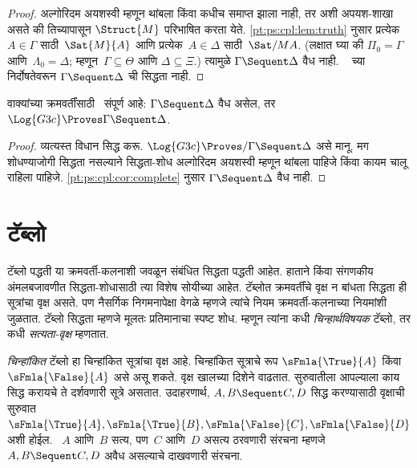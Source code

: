 \begin{proof}
  अल्गोरिदम अयशस्वी म्हणून थांबला किंवा कधीच समाप्त झाला नाही,
  तर अशी अपयश-शाखा असते की तिच्यापासून
  $\Struct{M}$ परिभाषित करता येते.
  \ref{pt:ps:cpl:lem:truth} नुसार प्रत्येक~$A \in \Gamma$
  साठी~$\Sat{M}{A}$ आणि प्रत्येक~$A \in \Delta$
  साठी~$\Sat/{M}{A}$. (लक्षात घ्या की
  $\Pi_0 = \Gamma$ आणि~$\Lambda_0 = \Delta$;
  म्हणून~$\Gamma \subseteq \Theta$ आणि
  $\Delta \subseteq \Xi$.) त्यामुळे
  $\Gamma \Sequent \Delta$ वैध नाही.
  ~ च्या निर्दोषतेवरून
  $\Gamma \Sequent \Delta$ ची सिद्धता नाही.
\end{proof}

\begin{cor}
वाक्यांच्या क्रमवर्तींसाठी~ संपूर्ण आहे:
$\Gamma \Sequent \Delta$ वैध असेल,
तर~$\Log{G3c} \Proves \Gamma \Sequent \Delta$.
\end{cor}

\begin{proof}
  व्यत्यस्त विधान सिद्ध करू.
  $\Log{G3c} \Proves/ \Gamma \Sequent \Delta$
  असे मानू. मग शोधण्याजोगी सिद्धता नसल्याने
  सिद्धता-शोध अल्गोरिदम अयशस्वी म्हणून थांबला पाहिजे
  किंवा कायम चालू राहिला पाहिजे.
  \ref{pt:ps:cpl:cor:complete} नुसार
  $\Gamma \Sequent \Delta$ वैध नाही.
\end{proof}













\section{टॅब्लो}\label{pt:ps:tab:sec}

टॅब्लो पद्धती या क्रमवर्ती-कलनाशी जवळून
संबंधित सिद्धता पद्धती आहेत. हाताने किंवा
संगणकीय अंमलबजावणीत सिद्धता-शोधासाठी त्या विशेष
सोयीच्या आहेत. टॅब्लोत क्रमवर्तींचे वृक्ष न बांधता
सिद्धता ही सूत्रांचा वृक्ष असते.
पण नैसर्गिक निगमनापेक्षा वेगळे म्हणजे त्यांचे नियम
क्रमवर्ती-कलनाच्या नियमांशी जुळतात. टॅब्लो
सिद्धता म्हणजे मूलतः प्रतिमानाचा स्पष्ट शोध.
म्हणून त्यांना कधी \emph{चिन्हार्थविषयक} टॅब्लो,
तर कधी \emph{सत्यता-वृक्ष} म्हणतात.

\emph{चिन्हांकित} टॅब्लो हा चिन्हांकित
सूत्रांचा वृक्ष आहे. चिन्हांकित सूत्राचे रूप
$\sFmla{\True}{A}$ किंवा~$\sFmla{\False}{A}$
असे असू शकते. वृक्ष खालच्या दिशेने वाढतात.
सुरुवातीला आपल्याला काय सिद्ध करायचे ते
दर्शवणारी सूत्रे असतात. उदाहरणार्थ,
$A, B \Sequent C, D$ सिद्ध करण्यासाठी
वृक्षाची सुरुवात
$\sFmla{\True}{A}, \sFmla{\True}{B},
\sFmla{\False}{C}, \sFmla{\False}{D}$ अशी
होईल. ~$A$ आणि~$B$ सत्य, पण~$C$ आणि~$D$
असत्य ठरवणारी संरचना म्हणजे
$A, B \Sequent C, D$ अवैध असल्याचे
दाखवणारी संरचना.

